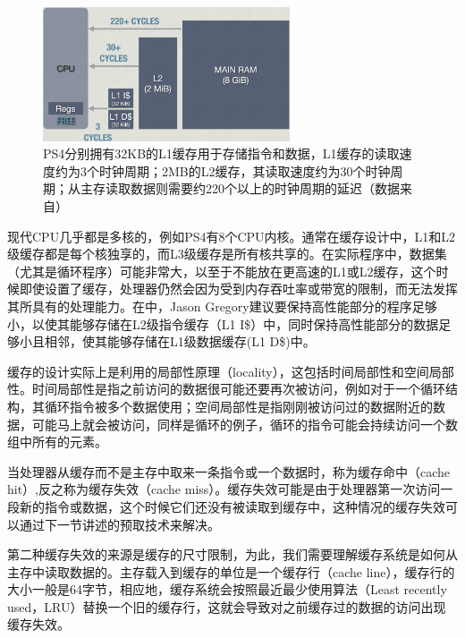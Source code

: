 \begin{figure}
	\sidecaption
	\includegraphics[width=0.65\textwidth]{figures/rp/cpu-cache}
	\caption{PS4分别拥有32KB的L1缓存用于存储指令和数据，L1缓存的读取速度约为3个时钟周期；2MB的L2缓存，其读取速度约为30个时钟周期；从主存读取数据则需要约220个以上的时钟周期的延迟（数据来自\cite{a:DoggedDetermination:TechnologyandProcessatNaughtyDogInc.}）}
	\label{f:rp-ps4-cache}
\end{figure}

现代CPU几乎都是多核的，例如PS4\cite{a:PS4SystemArchitecture}有8个CPU内核。通常在缓存设计中，L1和L2级缓存都是每个核独享的，而L3级缓存是所有核共享的。在实际程序中，数据集（尤其是循环程序）可能非常大，以至于不能放在更高速的L1或L2缓存，这个时候即使设置了缓存，处理器仍然会因为受到内存吞吐率或带宽的限制，而无法发挥其所具有的处理能力。在\cite{a:DoggedDetermination:TechnologyandProcessatNaughtyDogInc.}中，Jason Gregory建议要保持高性能部分的程序足够小，以使其能够存储在L2级指令缓存（L1 I\$）中，同时保持高性能部分的数据足够小且相邻，使其能够存储在L1级数据缓存(L1 D\$)中。

缓存的设计实际上是利用的局部性原理（locality），这包括时间局部性和空间局部性。时间局部性是指之前访问的数据很可能还要再次被访问，例如对于一个循环结构，其循环指令被多个数据使用；空间局部性是指刚刚被访问过的数据附近的数据，可能马上就会被访问，同样是循环的例子，循环的指令可能会持续访问一个数组中所有的元素。

当处理器从缓存而不是主存中取来一条指令或一个数据时，称为缓存命中（cache hit）,反之称为缓存失效（cache miss）。缓存失效可能是由于处理器第一次访问一段新的指令或数据，这个时候它们还没有被读取到缓存中，这种情况的缓存失效可以通过下一节讲述的预取技术来解决。

第二种缓存失效的来源是缓存的尺寸限制，为此，我们需要理解缓存系统是如何从主存中读取数据的。主存载入到缓存的单位是一个缓存行（cache line），缓存行的大小一般是64字节，相应地，缓存系统会按照最近最少使用算法（Least recently used，LRU）替换一个旧的缓存行，这就会导致对之前缓存过的数据的访问出现缓存失效。

